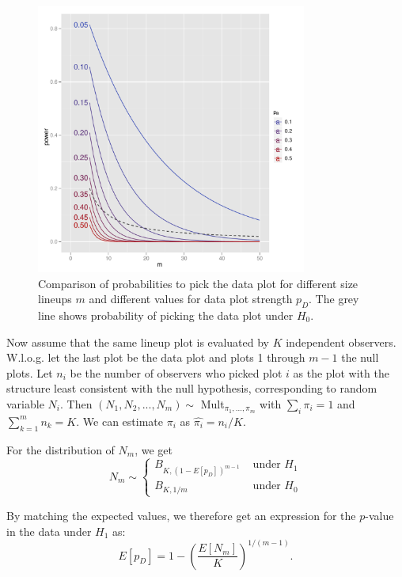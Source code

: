 \documentclass{article}
\begin{document}
\begin{figure}[htbp] %
   \centering
   \includegraphics[width=3.5in]{images/powerplot.pdf} 
   \caption{Comparison of probabilities to pick the data plot for different size lineups $m$ and different values for data plot strength $p_D$. The grey line shows probability of picking the data plot under $H_0$. }
   \label{fig:pval_power}
\end{figure}

Now assume that the same lineup plot is evaluated by $K$ independent observers. W.l.o.g. let the last plot be the data plot and plots 1 through $m-1$ the null plots. Let $n_i$ be the number of observers who picked plot $i$ as the plot with the structure least consistent with the null hypothesis, corresponding to random variable $N_i$.  Then  $(N_1, N_2, ..., N_m) \sim$ Mult$_{\pi_1, ..., \pi_m}$ with $\sum_i \pi_i = 1$ and $\sum_{k=1}^{m} n_k = K$. We can estimate $\pi_i$ as $\widehat{\pi_i} = n_i/K$. 

For the distribution of $N_m$, %
we get
\[
N_m\sim \left \{ 
\begin{array}{ll}
B_{K, (1-E[p_D])^{m-1}} & \text { under } H_1\\
B_{K, 1/m} & \text { under } H_0
\end{array}
\right .
\]

By matching the expected values, we therefore get an expression for the $p$-value in the data under $H_1$  as:
\begin{equation}\label{eqn:power_estimate}
{E[p_D]} = 1- \left(\frac{E[N_m]}{K}\right)^{1/(m-1)}.
\end{equation}
\end{document}
